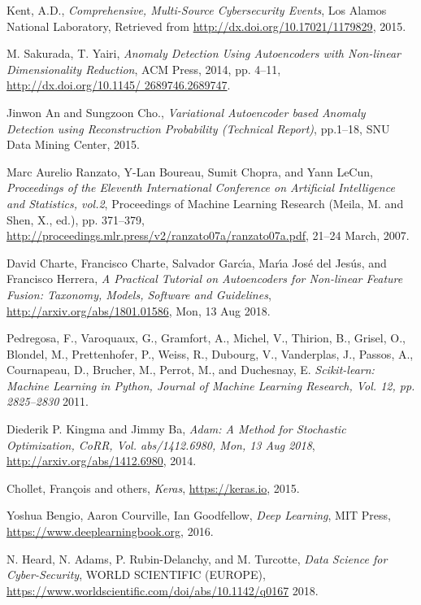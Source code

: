 \documentclass[sigconf]{acmart}
\begin{document}
\begin{thebibliography}{9}
 Kent, A.D.,
 \textit{Comprehensive, Multi-Source Cybersecurity Events},
 Los Alamos National Laboratory,
 Retrieved from \url{http://dx.doi.org/10.17021/1179829},
 2015.

M. Sakurada, T. Yairi,
\textit{Anomaly Detection Using Autoencoders with Non-linear Dimensionality Reduction},
ACM Press, 2014, pp. 4--11, \url{http://dx.doi.org/10.1145/ 2689746.2689747}. 

Jinwon An and Sungzoon Cho.,
\textit{Variational Autoencoder based Anomaly Detection using Reconstruction Probability (Technical Report)},
pp.1--18, SNU Data Mining Center,
2015.

Marc Aurelio Ranzato, Y-Lan Boureau, Sumit Chopra, and Yann LeCun,
\textit{Proceedings of the Eleventh International Conference on Artificial Intelligence and Statistics, vol.2},
Proceedings of Machine Learning Research (Meila, M. and Shen, X., ed.), pp. 371--379,
\url{http://proceedings.mlr.press/v2/ranzato07a/ranzato07a.pdf},
21--24 March, 2007.

David Charte, Francisco Charte, Salvador Garc{\'{\i}}a, Mar{\'{\i}}a Jos{\'{e}} del Jes{\'{u}}s, and Francisco Herrera,
\textit{A Practical Tutorial on Autoencoders for Non-linear Feature Fusion: Taxonomy, Models, Software and Guidelines},
\url{http://arxiv.org/abs/1801.01586},
Mon, 13 Aug 2018.

Pedregosa, F., Varoquaux, G., Gramfort, A., Michel, V., Thirion, B., Grisel, O., Blondel, M., Prettenhofer, P., Weiss, R., Dubourg, V., Vanderplas, J., Passos, A., Cournapeau, D., Brucher, M., Perrot, M., and Duchesnay, E.
\textit{Scikit-learn: Machine Learning in {P}ython, Journal of Machine Learning Research, Vol. 12, pp. 2825--2830}
2011.

Diederik P. Kingma and Jimmy Ba,
\textit{Adam: {A} Method for Stochastic Optimization, CoRR, Vol. abs/1412.6980, Mon, 13 Aug 2018},
\url{http://arxiv.org/abs/1412.6980},
2014.

Chollet, Fran\c{c}ois and others,
\textit{Keras},
\url{https://keras.io},
2015.

Yoshua Bengio, Aaron Courville, Ian Goodfellow,
\textit{Deep Learning},
MIT Press,
\url{https://www.deeplearningbook.org},
2016.

N. Heard, N. Adams, P. Rubin-Delanchy, and M. Turcotte,
\textit{Data Science for Cyber-Security},
WORLD SCIENTIFIC (EUROPE),
\url{https://www.worldscientific.com/doi/abs/10.1142/q0167}
2018.


\end{thebibliography}
\end{document}
